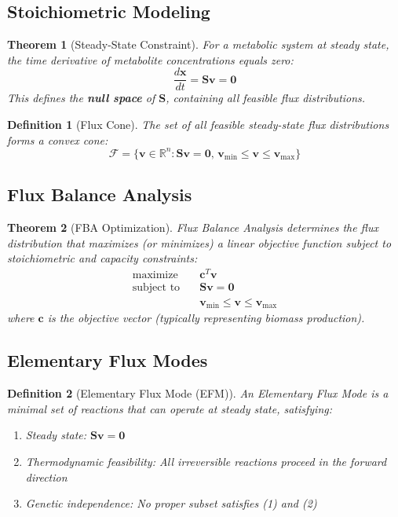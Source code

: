 \documentclass[a4paper, 11pt]{article}
\newtheorem{definition}{Definition}[section]
\newtheorem{theorem}{Theorem}[section]
\begin{document}
\subsection{Stoichiometric Modeling}

\begin{theorem}[Steady-State Constraint]
For a metabolic system at steady state, the time derivative of metabolite concentrations equals zero:
\begin{equation}
\frac{d\mathbf{x}}{dt} = \mathbf{S} \mathbf{v} = \mathbf{0}
\end{equation}
This defines the \textbf{null space} of $\mathbf{S}$, containing all feasible flux distributions.
\end{theorem}

\begin{definition}[Flux Cone]
The set of all feasible steady-state flux distributions forms a convex cone:
\begin{equation}
\mathcal{F} = \{ \mathbf{v} \in \mathbb{R}^n : \mathbf{S} \mathbf{v} = \mathbf{0}, \, \mathbf{v}_{\text{min}} \leq \mathbf{v} \leq \mathbf{v}_{\text{max}} \}
\end{equation}
\end{definition}

\subsection{Flux Balance Analysis}

\begin{theorem}[FBA Optimization]
Flux Balance Analysis determines the flux distribution that maximizes (or minimizes) a linear
objective function subject to stoichiometric and capacity constraints:
\begin{align}
\text{maximize} \quad & \mathbf{c}^T \mathbf{v} \\
\text{subject to} \quad & \mathbf{S} \mathbf{v} = \mathbf{0} \nonumber \\
& \mathbf{v}_{\text{min}} \leq \mathbf{v} \leq \mathbf{v}_{\text{max}} \nonumber
\end{align}
where $\mathbf{c}$ is the objective vector (typically representing biomass production).
\end{theorem}

\subsection{Elementary Flux Modes}

\begin{definition}[Elementary Flux Mode (EFM)]
An Elementary Flux Mode is a minimal set of reactions that can operate at steady state, satisfying:
\begin{enumerate}
\item Steady state: $\mathbf{S} \mathbf{v} = \mathbf{0}$
\item Thermodynamic feasibility: All irreversible reactions proceed in the forward direction
\item Genetic independence: No proper subset satisfies (1) and (2)
\end{enumerate}
\end{definition}
\end{document}
